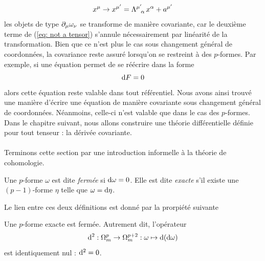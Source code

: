 \begin{equation}
    x^\mu \to x^{\mu'} = \Lambda\indices{^{\mu'}_\!_\alpha}\,x^\alpha +a^{\mu'}
\end{equation}
les objets de type $\partial_\mu \omega _\nu$ se transforme de manière covariante, car le deuxième terme de (\ref{eq: not a tensor}) s'annule nécessairement par linéarité de la transformation. Bien que ce n'est plus le cas sous changement général de coordonnées, la covariance reste assuré lorsqu'on se restreint à des $p$-formes. Par exemple, si une équation permet de se réécrire dans la forme
\begin{equation}
    \mathrm{d} F = 0
\end{equation}
alors cette équation reste valable dans tout référentiel. Nous avons ainsi trouvé une manière d'écrire une équation de manière covariante sous changement général de coordonnées. Néanmoins, celle-ci n'est valable que dans le cas des $p$-formes. Dans le chapitre suivant, nous allons construire une théorie différentielle définie pour tout tenseur : la dérivée covariante.\\
\\
Terminons cette section par une introduction informelle à la théorie de cohomologie.
\begin{theoremframe}
    \begin{defi}
        Une $p$-forme $\omega $ est dite \emph{fermée} si $\mathrm{d} \omega  = 0$. Elle est dite \emph{exacte} s'il existe une $(p-1)$-forme $\eta$ telle que $\omega =\mathrm{d} \eta$.
    \end{defi}
\end{theoremframe}
Le lien entre ces deux définitions est donné par la prorpiété suivante
\begin{theoremframe}
    \begin{propri}
        Une $p$-forme exacte est fermée. Autrement dit, l'opérateur
        \begin{equation}
            \mathrm{d} ^2: \Omega_m^p \to \Omega_m^{p+2}:\omega  \mapsto \mathrm{d} (\mathrm{d} \omega )
        \end{equation}
        est identiquement nul : $\mathrm{d}^2=0$.
    \end{propri}
\end{theoremframe}
